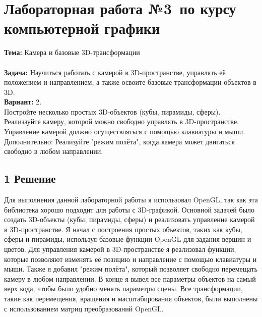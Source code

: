 \documentclass[12pt]{article}
\begin{document}




\section*{Лабораторная работа №3\, по курсу компьютерной графики}

\textbf{Тема:} Камера и базовые 3D-трансформации\\
\\
\textbf{Задача:} Научиться работать с камерой в 3D-пространстве, управлять её положением и направлением, а также освоите базовые трансформации объектов в 3D.\\
\textbf{Вариант:} 2.\\
Постройте несколько простых 3D-объектов (кубы, пирамиды, сферы).\\
Реализауйте камеру, которой можно свободно управлять в 3D-пространстве.
Управление камерой должно осуществляться с помощью клавиатуры и мыши.
Дополнительно: Реализуйте "режим полёта", когда камера может двигаться свободно в любом направлении.

\subsection*{1 Решение}
Для выполнения данной лабораторной работы я использовал OpenGL, так как эта библиотека хорошо подходит для работы с 3D-графикой. 
Основной задачей было создать 3D-объекты (кубы, пирамиды, сферы) и реализовать управление камерой в 3D-пространстве.
Я начал с построения простых объектов, таких как кубы, сферы и пирамиды, используя базовые функции OpenGL для задания вершин и цветов. 
Для управления камерой в 3D-пространстве я реализовал функции, которые позволяют изменять её позицию и направление с помощью клавиатуры и мыши. 
Также я добавил "режим полёта", который позволяет свободно перемещать камеру в любом направлении.
В конце я вывел все параметры объектов на самый верх кода, чтобы было удобно менять параметры сцены.
Все трансформации, такие как перемещения, вращения и масштабирования объектов, были выполнены с использованием матриц преобразований OpenGL.\\
\end{document}
